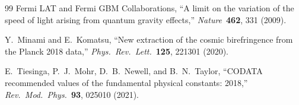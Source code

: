 ﻿\documentclass[a4paper,12pt]{article}
\begin{document}
\begin{thebibliography}{99}
  Fermi LAT and Fermi GBM Collaborations,
  ``A limit on the variation of the speed of light arising from
  quantum gravity effects,''
  \emph{Nature}\ \textbf{462}, 331 (2009).

  Y.~Minami and E.~Komatsu,
  ``New extraction of the cosmic birefringence from the Planck 2018
  data,''
  \emph{Phys.\ Rev.\ Lett.}\ \textbf{125}, 221301 (2020).

  E.~Tiesinga, P.~J.~Mohr, D.~B.~Newell, and B.~N.~Taylor,
  ``CODATA recommended values of the fundamental physical constants: 2018,''
  \emph{Rev.\ Mod.\ Phys.}\ \textbf{93}, 025010 (2021).

\end{thebibliography}
\end{document}

